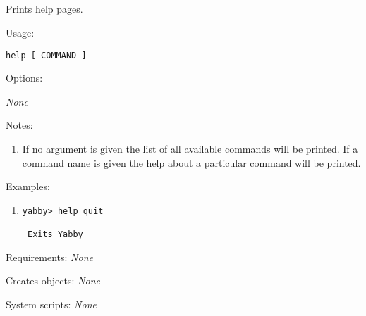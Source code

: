 

\subsection[help]{  }



Prints help pages.


\begin{description}


\item{Usage:}

{\tt help [ COMMAND ]}


\item{Options:}
\begin{description}
{\em None}
\end{description}


\item{Notes:}
\begin{enumerate}
\item If no argument is given the list of all available commands will
be printed. If a command name is given the help about a particular
command will be printed. 
\end{enumerate}


\item{Examples:}
\begin{enumerate}

\item
\begin{verbatim}
yabby> help quit

 Exits Yabby

\end{verbatim}

\end{enumerate}


\item{Requirements:} {\em None}


\item{Creates objects:} {\em None}


\item{System scripts:} {\em None}

\end{description}

